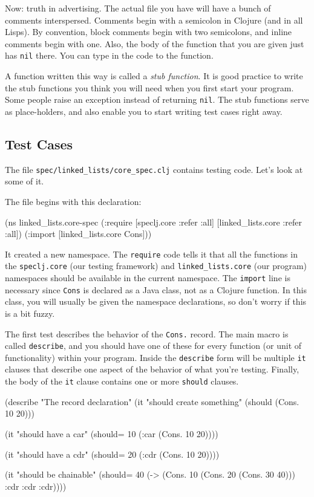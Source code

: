\documentclass[12pt]{article}
\begin{document}
Now: truth in advertising.  The actual file you have will have a bunch of comments interspersed.
Comments begin with a semicolon in Clojure (and in all Lisps).  By convention, block comments begin
with two semicolons, and inline comments begin with one.  Also, the body of the function that you
are given just has \texttt{nil} there.  You can type in the code to the function.

A function written this way is called a \emph{stub function}.  It is good practice to write the stub
functions you think you will need when you first start your program.  Some people raise an exception
instead of returning \texttt{nil}.  The stub functions serve as place-holders, and also enable you
to start writing test cases right away.

\subsection{Test Cases}

The file \texttt{spec/linked\_lists/core\_spec.clj} contains testing code.  Let's look at some of
it.

The file begins with this declaration:

\begin{clojurecode}
(ns linked_lists.core-spec
  (:require [speclj.core :refer :all]
            [linked_lists.core :refer :all])
  (:import [linked_lists.core Cons]))
\end{clojurecode}

It created a new namespace.  The \texttt{require} code tells it that all the functions in the
\texttt{speclj.core} (our testing framework) and \texttt{linked\_lists.core} (our program)
namespaces should be available in the current namespace.  The \texttt{import} line is necessary
since \texttt{Cons} is declared as a Java class, not as a Clojure function.  In this class, you will
usually be given the namespace declarations, so don't worry if this is a bit fuzzy.

The first test describes the behavior of the \texttt{Cons.} record.  The main macro is called
\texttt{describe}, and you should have one of these for every function (or unit of functionality)
within your program.  Inside the \texttt{describe} form will be multiple \texttt{it} clauses that
describe one aspect of the behavior of what you're testing.  Finally, the body of the \texttt{it}
clause contains one or more  \texttt{should} clauses.

\begin{clojurecode}
(describe "The record declaration"
          (it "should create something"
              (should (Cons. 10 20)))

          (it "should have a car"
              (should= 10 (:car (Cons. 10 20))))

          (it "should have a cdr"
              (should= 20 (:cdr (Cons. 10 20))))

          (it "should be chainable"
              (should= 40 (-> (Cons. 10 (Cons. 20 (Cons. 30 40))) :cdr :cdr :cdr))))
\end{clojurecode}
\end{document}
